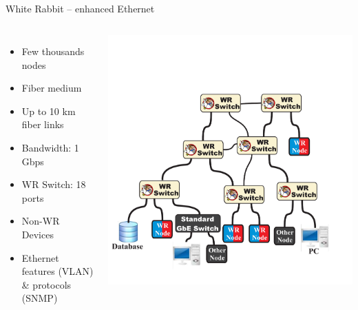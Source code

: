 \documentclass[compress,red]{beamer}
\begin{document}
\subsection{}
\begin{frame}{White Rabbit -- enhanced Ethernet}

\begin{columns}[c]
 

  \begin{itemize}
    \item Few thousands nodes
    \item Fiber medium
    \item Up to 10 km fiber links
    \item Bandwidth: 1 Gbps
    \item WR Switch: 18 ports
    \item Non-WR Devices
    \item Ethernet features (VLAN) \& protocols (SNMP)
  \end{itemize}

    \begin{center}
    \includegraphics[width=1.0\textwidth]{network/WR_network-ethernet.pdf}
    \end{center}
\end{columns}

\end{frame}
\end{document}
